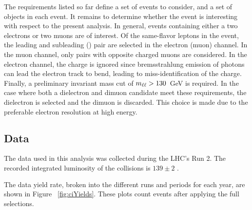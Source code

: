 The requirements listed so far define a set of events to consider, and a set of objects in each event.
It remains to determine whether the event is interesting with respect to the present analysis.
In general, events containing either a two electrons or two muons are of interest.
Of the same-flavor leptons in the event, the leading and subleading \et (\pt) pair are selected in the electron (muon) channel.
In the muon channel, only pairs with opposite charged muons are considered. 
In the electron channel, the charge is ignored since bremsstrahlung emission of photons can lead the electron track to bend, leading to miss-identification of the charge.
Finally, a preliminary invariant mass cut of $m_{\ell\ell}>130$~GeV is required.
In the case where both a dielectron and dimuon candidate meet these requirements, the dielectron is selected and the dimuon is discarded.
This choice is made due to the preferable electron \et resolution at high energy.

\subsection{Data}
The data used in this analysis was collected during the LHC's Run 2.
The recorded integrated luminosity of the collisions is $139\pm2$ \fb. \cite{ATLAS-CONF-2019-021}

The data yield rate, broken into the different runs and periods for each year, are shown in Figure ~\ref{fig:ciYields}.
These plots count events after applying the full selections.

